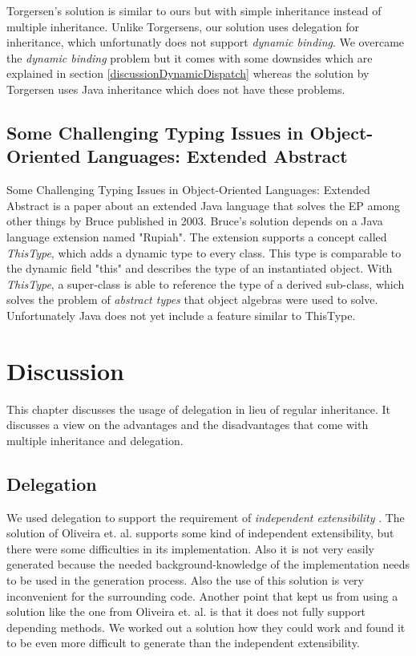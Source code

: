 \documentclass{report}
\begin{document}
Torgersen's solution is similar to ours but with simple inheritance instead of multiple inheritance.
Unlike Torgersens, our solution uses delegation for inheritance, which unfortunatly does not support \emph{dynamic binding}. We overcame the \emph{dynamic binding} problem but it comes with some downsides which are explained in section \ref{discussionDynamicDispatch} whereas the solution by Torgersen uses Java inheritance which does not have these problems.

\subsection*{Some Challenging Typing Issues in Object-Oriented Languages: Extended Abstract}

{Some Challenging Typing Issues in Object-Oriented Languages: Extended Abstract} is a paper about an extended Java language that solves the EP among other things by Bruce published in 2003\cite{Bruce-Typing-2003}.
Bruce's solution depends on a Java language extension named "Rupiah"\cite{Foster-Rupiah-2001}. The extension supports a concept called \emph{ThisType}, which adds a dynamic type to every class. This type is comparable to the dynamic field "this" and describes the type of an instantiated object. With \emph{ThisType}, a super-class is able to reference the type of a derived sub-class, which solves the problem of \emph{abstract types} that object algebras were used to solve. Unfortunately Java does not yet include a feature similar to ThisType.

\section{Discussion}

This chapter discusses the usage of delegation in lieu of regular inheritance. It discusses a view on the advantages and the disadvantages that come with multiple inheritance and delegation.

\subsection{Delegation}
We used delegation to support the requirement of \emph{independent extensibility} \cite{Odersky-Expression-2005, Oliv-Extensibility-2012}. The solution of Oliveira et. al. supports some kind of independent extensibility, but there were some difficulties in its implementation. Also it is not very easily generated because the needed background-knowledge of the implementation needs to be used in the generation process. Also the use of this solution is very inconvenient for the surrounding code. Another point that kept us from using a solution like the one from Oliveira et. al. is that it does not fully support depending methods. We worked out a solution how they could work and found it to be even more difficult to generate than the independent extensibility.
\end{document}

